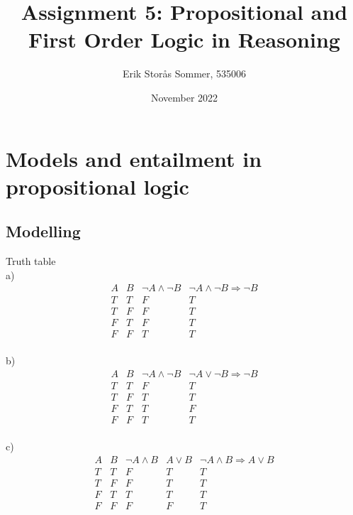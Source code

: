 \documentclass{article}
\title{Assignment 5: Propositional and First Order Logic in Reasoning}
\author{Erik Storås Sommer, 535006}
\date{November 2022}
\begin{document}
\maketitle

\section{Models and entailment in propositional logic}

\subsection{Modelling}

Truth table\\

a)\\
\begin{displaymath}
\begin{array}{|c|c|c|c|c}

A & 
B & 
\neg A \wedge \neg B &
\neg A \wedge \neg B \Rightarrow \neg B\\ %
\hline  %
T & T & F & T\\
T & F & F & T\\
F & T & F & T\\
F & F & T & T\\

\end{array}
\end{displaymath}


b)\\
\begin{displaymath}
\begin{array}{|c|c|c|c|c}

A &
B & 
\neg A \wedge \neg B &
\neg A \vee \neg B \Rightarrow \neg B\\ %
\hline  %
T & T & F & T\\
T & F & T & T\\
F & T & T & F\\
F & F & T & T\\

\end{array}
\end{displaymath}


c)\\
\begin{displaymath}
\begin{array}{|c|c|c|c|c|c}

A & 
B & 
\neg A \wedge B & 
A \vee B & \neg A \wedge B \Rightarrow A \vee B\\ %
\hline  %
T & T & F & T & T\\
T & F & F & T & T\\
F & T & T & T & T\\
F & F & F & F & T\\

\end{array}
\end{displaymath}
\end{document}

